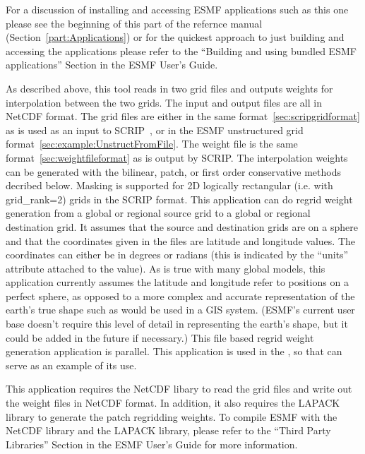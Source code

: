 For a discussion of installing and accessing ESMF applications such as this one please see the beginning of this part of the refernce manual (Section~\ref{part:Applications}) or for the quickest approach to just building and accessing the applications please refer to the ``Building and using bundled ESMF applications'' Section in the ESMF User's Guide.

As described above, this tool reads in
two grid files and outputs weights for interpolation
between the two grids. The input and output files are all in NetCDF format. The grid files are either in 
the same format~\ref{sec:scripgridformat} as is used as an input to SCRIP~\cite{ref:SCRIP}, or in the ESMF unstructured grid format~\ref{sec:example:UnstructFromFile}. The weight file is the same format~\ref{sec:weightfileformat} as is 
output by SCRIP. The interpolation weights can be generated with
the bilinear, patch, or first order conservative methods decribed below. Masking is supported for 2D logically rectangular (i.e. with grid\_rank=2) grids in the SCRIP format. This application 
can do regrid weight generation from a global or regional source grid to a global or regional destination grid.
It assumes that the source and destination grids are on a sphere and that the coordinates given in 
the files are latitude and longitude values. The coordinates can either be in degrees or radians (this is indicated by the ``units'' attribute attached to the value). 
As is true with many global models, this application currently assumes the latitude and longitude refer to positions on a perfect sphere, as opposed to a more complex 
and accurate representation of the earth's true shape such as would be used in a GIS system. (ESMF's current user base doesn't require this level of detail in representing the earth's shape, but it could be added in the future if necessary.)  This file based regrid weight generation application 
is parallel. This application is used in the 
, so that can serve as an example of its use.

This application requires the NetCDF libary to read the grid files and write
out the weight files in NetCDF format.  
In addition, it also requires the LAPACK library to generate the patch regridding weights.
To compile ESMF with the NetCDF library and the LAPACK library, please refer to 
the ``Third Party Libraries'' Section in the ESMF User's Guide for more information.

